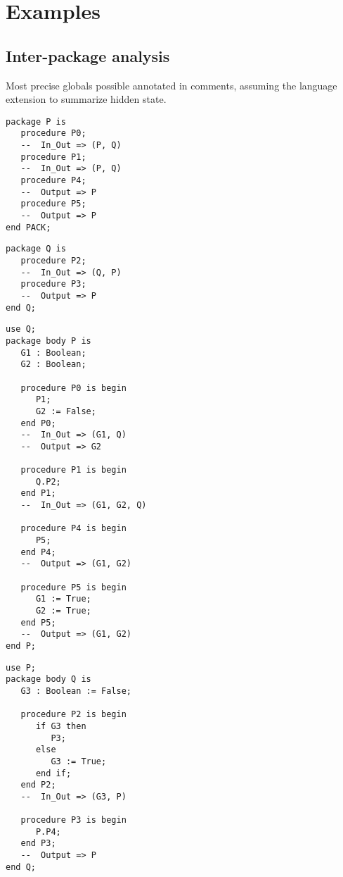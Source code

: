 \documentclass{article}
\begin{document}
\pagebreak
\section{Examples}

\subsection{Inter-package analysis}
Most precise globals possible annotated in comments, assuming the language
extension to summarize hidden state.

\begin{multicols}{2}

\begin{lstlisting}
package P is
   procedure P0;
   --  In_Out => (P, Q)
   procedure P1;
   --  In_Out => (P, Q)
   procedure P4;
   --  Output => P
   procedure P5;
   --  Output => P
end PACK;
\end{lstlisting}

\vfill\columnbreak

\begin{lstlisting}
package Q is
   procedure P2;
   --  In_Out => (Q, P)
   procedure P3;
   --  Output => P
end Q;
\end{lstlisting}

\end{multicols}

\begin{multicols}{2}

\begin{lstlisting}
use Q;
package body P is
   G1 : Boolean;
   G2 : Boolean;

   procedure P0 is begin
      P1;
      G2 := False;
   end P0;
   --  In_Out => (G1, Q)
   --  Output => G2

   procedure P1 is begin
      Q.P2;
   end P1;
   --  In_Out => (G1, G2, Q)

   procedure P4 is begin
      P5;
   end P4;
   --  Output => (G1, G2)

   procedure P5 is begin
      G1 := True;
      G2 := True;
   end P5;
   --  Output => (G1, G2)
end P;
\end{lstlisting}

\vfill\columnbreak

\begin{lstlisting}
use P;
package body Q is
   G3 : Boolean := False;

   procedure P2 is begin
      if G3 then
         P3;
      else
         G3 := True;
      end if;
   end P2;
   --  In_Out => (G3, P)

   procedure P3 is begin
      P.P4;
   end P3;
   --  Output => P
end Q;
\end{lstlisting}

\end{multicols}
\end{document}
